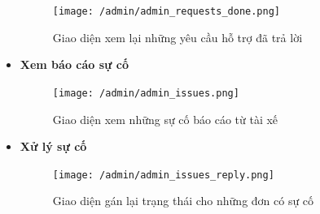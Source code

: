 \begin{itemize}
	\begin{figure}[H]
		\texttt{[image: /admin/admin\_requests\_done.png]}
		\centering
		\caption{Giao diện xem lại những yêu cầu hỗ trợ đã trả lời}
	\end{figure}

	\item \textbf{Xem báo cáo sự cố}
	\begin{figure}[H]
		\texttt{[image: /admin/admin\_issues.png]}
		\centering
		\caption{Giao diện xem những sự cố báo cáo từ tài xế}
	\end{figure}


	\item \textbf{Xử lý sự cố}
	\begin{figure}[H]
		\texttt{[image: /admin/admin\_issues\_reply.png]}
		\centering
		\caption{Giao diện gán lại trạng thái cho những đơn có sự cố}
	\end{figure}
		
\end{itemize}























